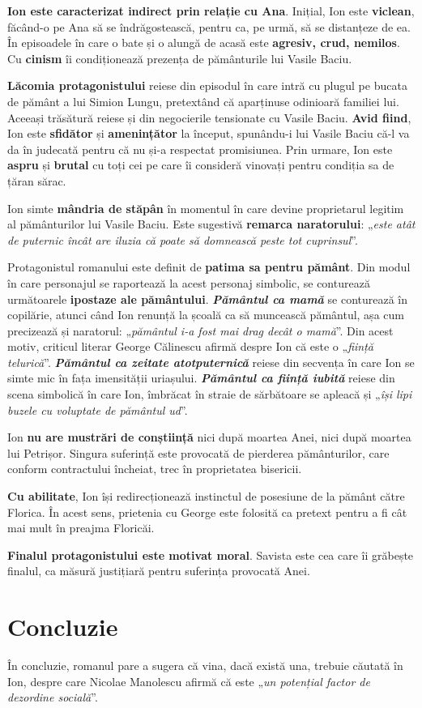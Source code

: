 \documentclass{article}
\newcommand{\qu}[1]{„\emph{#1}”}
\begin{document}
\textbf{Ion este caracterizat indirect prin relație cu Ana}. Inițial, Ion este \textbf{viclean}, făcând-o pe Ana să se îndrăgostească, pentru ca, pe urmă, să se distanțeze de ea. În episoadele în care o bate și o alungă de acasă este \textbf{agresiv, crud, nemilos}. Cu \textbf{cinism} îi condiționează prezența de pământurile lui Vasile Baciu.

\textbf{Lăcomia protagonistului} reiese din episodul în care intră cu plugul pe bucata de pământ a lui Simion Lungu, pretextând că aparținuse odinioară familiei lui. Aceeași trăsătură reiese și din negocierile tensionate cu Vasile Baciu. \textbf{Avid fiind}, Ion este \textbf{sfidător} și \textbf{amenințător} la început, spunându-i lui Vasile Baciu că-l va da în judecată pentru că nu și-a respectat promisiunea. Prin urmare, Ion este \textbf{aspru} și \textbf{brutal} cu toți cei pe care îi consideră vinovați pentru condiția sa de țăran sărac.

Ion simte \textbf{mândria de stăpân} în momentul în care devine proprietarul legitim al pământurilor lui Vasile Baciu. Este sugestivă \textbf{remarca naratorului}: \qu{este atât de puternic încât are iluzia că poate să domnească peste tot cuprinsul}.

Protagonistul romanului este definit de \textbf{patima sa pentru pământ}. Din modul în care personajul se raportează la acest personaj simbolic, se conturează următoarele \textbf{ipostaze ale pământului}. \textsl{\textbf{Pământul ca mamă}} se conturează în copilărie, atunci când Ion renunță la școală ca să muncească pământul, așa cum precizează și naratorul: \qu{pământul i-a fost mai drag decât o mamă}. Din acest motiv, criticul literar George Călinescu afirmă despre Ion că este o \qu{ființă telurică}. \textsl{\textbf{Pământul ca zeitate atotputernică}} reiese din secvența în care Ion se simte mic în fața imensității uriașului. \textsl{\textbf{Pământul ca ființă iubită}} reiese din scena simbolică în care Ion, îmbrăcat în straie de sărbătoare se apleacă și \qu{își lipi buzele cu voluptate de pământul ud}.

Ion \textbf{nu are mustrări de conștiință} nici după moartea Anei, nici după moartea lui Petrișor. Singura suferință este provocată de pierderea pământurilor, care conform contractului încheiat, trec în proprietatea bisericii.

\textbf{Cu abilitate}, Ion își redirecționează instinctul de posesiune de la pământ către Florica. În acest sens, prietenia cu George este folosită ca pretext pentru a fi cât mai mult în preajma Floricăi.

\textbf{Finalul protagonistului este motivat moral}. Savista este cea care îi grăbește finalul, ca măsură justițiară pentru suferința provocată Anei.
\section{Concluzie}
În concluzie, romanul pare a sugera că vina, dacă există una, trebuie căutată în Ion, despre care Nicolae Manolescu afirmă că este \qu{un potențial factor de dezordine socială}.
\end{document}
